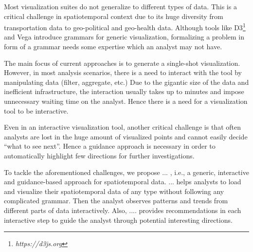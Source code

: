 \documentclass[runningheads,a4paper]{llncs}
\begin{document}

 Most visualization suites do not generalize to different types of data. This is a critical challenge in spatiotemporal context due to its huge diversity from transportation data to geo-political and geo-health data. Although tools like {\sc D3}\footnote{\it https://d3js.org} and {\sc Vega} \cite{satyanarayan2016reactive} introduce grammars for generic visualization, formalizing a problem in form of a grammar needs some expertise which an analyst may not have.

 The main focus of current approaches is to generate a single-shot visualization. However, in most analysis scenarios, there is a need to interact with the tool by manipulating data (filter, aggregate, etc.) Due to the gigantic size of the data and inefficient infrastructure, the interaction usually takes up to minutes and impose unnecessary waiting time on the analyst. Hence there is a need for a visualization tool to be interactive.

 Even in an interactive visualization tool, another critical challenge is that often analysts are lost in the huge amount of visualized points and cannot easily decide ``what to see next''. Hence a guidance approach is necessary in order to automatically highlight few directions for further investigations.

To tackle the aforementioned challenges, we propose ... , i.e., a generic, interactive and guidance-based approach for spatiotemporal data.  ...  helps analysts to load and visualize their spatiotemporal data of any type without following any complicated grammar. Then the analyst observes patterns and trends from different parts of data interactively. Also, ....  provides recommendations in each interactive step to guide the analyst through potential interesting directions.

\end{document}
